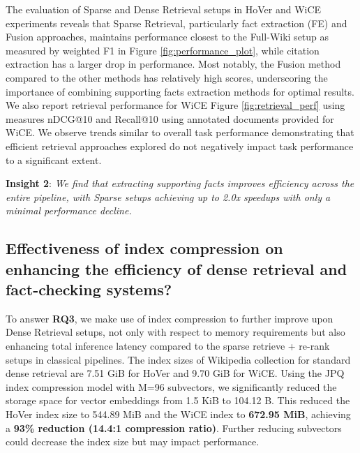 \begin{figure*}[hbt!]
    \begin{subfigure}{.5\textwidth}
        
    \end{subfigure}
        \begin{subfigure}{.5\textwidth}
    

    \end{subfigure}
    \caption{Retrieval performance comparison}
    \label{fig:retrieval_perf}
    \end{figure*}
The evaluation of Sparse and Dense Retrieval setups in HoVer and WiCE experiments reveals that Sparse Retrieval, particularly fact extraction (FE) and Fusion approaches, maintains performance closest to the Full-Wiki setup as measured by weighted F1 in Figure \ref{fig:performance_plot}, while citation extraction has a larger drop in performance. Most notably, the Fusion method compared to the other methods has relatively high scores, underscoring the importance of combining supporting facts extraction methods for optimal results. We also report retrieval performance for WiCE Figure \ref{fig:retrieval_perf} using measures nDCG@10 and Recall@10 using annotated documents provided for WiCE. We observe trends similar to overall task performance demonstrating that efficient retrieval approaches explored do not negatively impact task performance to a significant extent.

\noindent\textbf{Insight 2}: \textit{We find that extracting supporting facts improves efficiency across the entire pipeline, with Sparse setups achieving up to 2.0x speedups with only a minimal performance decline.}
\vspace{-1em}


%
\vspace{-2em}
\subsection{Effectiveness of index compression on enhancing the efficiency of dense retrieval and fact-checking systems?}

To answer \textbf{RQ3}, we make use of index compression to further improve upon Dense Retrieval setups, not only with respect to memory requirements but also enhancing total inference latency compared to the sparse retrieve + re-rank setups in classical pipelines.  The index sizes of Wikipedia collection for standard dense retrieval are 7.51 GiB for HoVer and 9.70 GiB for WiCE. Using the JPQ index compression model with M=96 subvectors, we significantly reduced the storage space for vector embeddings from 1.5 KiB to 104.12 B. This reduced the HoVer index size to 544.89 MiB and the WiCE index to \textbf{672.95 MiB}, achieving a \textbf{93\% reduction (14.4:1 compression ratio)}. Further reducing subvectors could decrease the index size but may impact performance.


